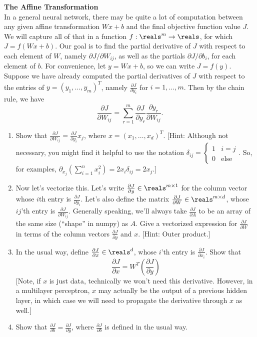 \documentclass{article}
\newcommand{\nyuparagraph}[1]{\vspace{0.3cm}\textcolor{nyupurple}{\bf \large #1}\\}
\theoremstyle{plain}
\theoremstyle{definition}
\begin{document}
\nyuparagraph{The Affine Transformation}

In a general neural network, there may be quite a lot of computation
between any given affine transformation $Wx+b$ and the final objective
function value $J$. We will capture all of that in a function $f:\reals^{m}\to\reals$,
for which $J=f(Wx+b)$. Our goal is to find the partial derivative
of $J$ with respect to each element of $W$, namely $\partial J/\partial W_{ij}$,
as well as the partials $\partial J/\partial b_{i}$, for each element
of $b$. For convenience, let $y=Wx+b$, so we can write $J=f(y)$.
Suppose we have already computed the partial derivatives of $J$ with
respect to the entries of $y=\left(y_{1},\ldots,y_{m}\right)^{T}$,
namely $\frac{\partial J}{\partial y_{i}}$ for $i=1,\ldots,m$. Then
by the chain rule, we have
\[
\frac{\partial J}{\partial W_{ij}}=\sum_{r=1}^{m}\frac{\partial J}{\partial y_{r}}\frac{\partial y_{r}}{\partial W_{ij}}.
\]

\begin{enumerate}
\setcounter{enumi}{\value{saveenum}}
\item Show that $\frac{\partial J}{\partial W_{ij}}=\frac{\partial J}{\partial y_{i}}x_{j}$,
where $x=\left(x_{1},\ldots,x_{d}\right)^{T}$. {[}Hint: Although
not necessary, you might find it helpful to use the notation $\delta_{ij}=\begin{cases}
1 & i=j\\
0 & \text{else}
\end{cases}$. So, for examples, $\partial_{x_{j}}\left(\sum_{i=1}^{n}x_{i}^{2}\right)=2x_{i}\delta_{ij}=2x_{j}$.{]}

\item Now let's vectorize this. Let's write $\frac{\partial J}{\partial y}\in\reals^{m\times1}$
for the column vector whose $i$th entry is $\frac{\partial J}{\partial y_{i}}$.
Let's also define the matrix $\frac{\partial J}{\partial W}\in\reals^{m\times d}$,
whose $ij$'th entry is $\frac{\partial J}{\partial W_{ij}}$. Generally
speaking, we'll always take $\frac{\partial J}{\partial A}$ to be
an array of the same size (``shape'' in numpy) as $A$. Give a vectorized
expression for $\frac{\partial J}{\partial W}$ in terms of the column
vectors $\frac{\partial J}{\partial y}$ and $x$. {[}Hint: Outer
product.{]} 

\item In the usual way, define $\frac{\partial J}{\partial x}\in\reals^{d}$,
whose $i$'th entry is $\frac{\partial J}{\partial x_{i}}$. Show
that 
\[
\frac{\partial J}{\partial x}=W^{T}\left(\frac{\partial J}{\partial y}\right)
\]
{[}Note, if $x$ is just data, technically we won't need this derivative.
However, in a multilayer perceptron, $x$ may actually be the output
of a previous hidden layer, in which case we will need to propagate
the derivative through $x$ as well.{]}

\item Show that $\frac{\partial J}{\partial b}=\frac{\partial J}{\partial y}$,
where $\frac{\partial J}{\partial b}$ is defined in the usual way. 
\setcounter{saveenum}{\value{enumi}}
\end{enumerate}
\end{document}
